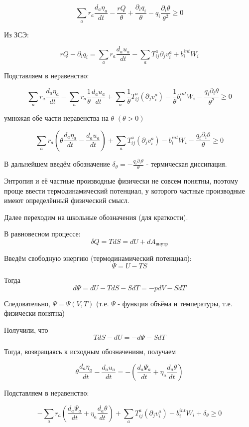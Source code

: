 \documentclass[main.tex]{subfiles}
\begin{document}
$$\sum\limits_{a}{r_a\frac{d_a\eta_a}{dt}}-\frac{rQ}{\theta}+\frac{\partial_iq_i}{\theta}-q_i\frac{\partial_i\theta}{\theta^2}\geq 0$$

Из ЗСЭ:

$$rQ-\partial_iq_i=\sum\limits_a{r_a\frac{d_au_a}{dt}}-\sum\limits_a{T_{ij}^a\partial_jv_i^a}+b_i^{int}W_i$$

Подставляем в неравенство:

$$\sum\limits_{a}{r_a\frac{d_a\eta_a}{dt}}-\sum\limits_{a}{r_a\frac{1}{\theta}\frac{d_au_a}{dt}}+\sum\limits_a{\frac{1}{\theta}T_{ij}^a\left(\partial_jv_i^a\right)-\frac{1}{\theta}b_i^{int}W_i}-\frac{q_i\partial_i\theta}{\theta^2}\geq 0$$

умножая обе части неравенства на $\theta\,\,\left(\theta>0\right)$

$$\sum\limits_a{r_a\left(\theta\frac{d_a\eta_a}{dt}-\frac{d_au_a}{dt}\right)}+\sum\limits_a{T_{ij}^a\left(\partial_j v_i^a\right)}-b_i^{int}W_i-\frac{q_i\partial_i\theta}{\theta}\geq 0$$

В дальнейшем введём обозначение $\displaystyle{}\delta_\theta=-\frac{q_i\partial_i\theta}{\theta}$ - термическая диссипация.


Энтропия и её частные производные физически не совсем понятны, поэтому проще ввести термодинамический потенциал, у которого частные производные имеют определённый физический смысл.

Далее переходим на школьные обозначения (для краткости).

В равновесном процессе: $$\delta Q=TdS=dU+dA_{внутр}$$

Введём свободную энергию (термодинамический потенциал): $$\Psi=U-TS$$

Тогда $$d\Psi=dU-TdS-SdT=-pdV-SdT$$

Следовательно, $\Psi=\Psi(V,T)$ (т.е. $\Psi$ - функция объёма и температуры, т.е. физически понятна)

Получили, что $$TdS-dU=-d\Psi-SdT$$

Тогда, возвращаясь к исходным обозначениям, получаем

$$\theta\frac{d_a\eta_a}{dt}-\frac{d_au_a}{dt}=-\left(\frac{d_a\Psi_a}{dt}+\eta_a\frac{d_a\theta}{dt}\right)$$

Подставляем в неравенство:

$$-\sum\limits_a{r_a\left(\frac{d_a\Psi_a}{dt}+\eta_a\frac{d_a\theta}{dt}\right)}+\sum\limits_a{T_{ij}^a\left(\partial_jv_i^a\right)}-b_i^{int}W_i+\delta_\theta\geq 0$$
\end{document}
